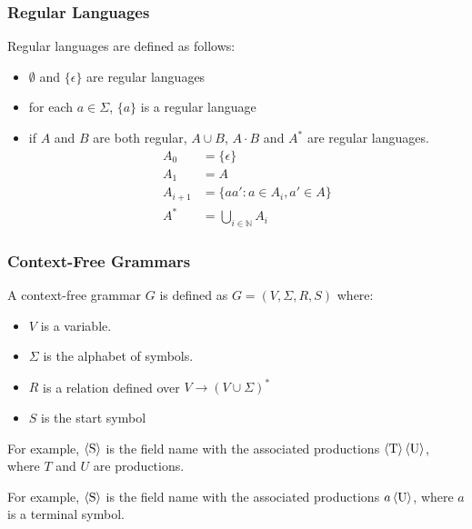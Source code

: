 \subsubsection{Regular Languages}
Regular languages are defined as follows:
\begin{itemize}
\item $\emptyset$ and $\{\epsilon\}$ are regular languages
\item for each $a\in\Sigma$, $\{a\}$ is a regular language
\item if $A$ and $B$ are both regular, $A\cup B$, $A\cdot B$ and $A^*$ are regular languages.
\begin{align*}
    A_0&=\{\epsilon\}\\
    A_1&= A\\
    A_{i+1} &= \{ aa' : a \in A_i, a'\in A\}\\
    A^* &= \bigcup_{i\in\mathbb N} A_i
\end{align*}
\end{itemize}

\subsubsection{Context-Free Grammars}
A context-free grammar $G$ is defined as $G=\left(V,\Sigma, R,S\right)$ where:
\begin{itemize}
\item $V$ is a variable.
\item $\Sigma$ is the alphabet of symbols.
\item $R$ is a relation defined over $V\rightarrow \left(V\cup\Sigma\right)^*$
\item $S$ is the start symbol
\end{itemize}

For example, $\langle \text S \rangle$ is the field name with the associated
productions $\langle \text T \rangle \, \langle \text U \rangle$, where $T$ and
$U$ are productions.

\begin{bnf*}
\end{bnf*}

For example, $\langle \text S \rangle$ is the field name with the associated
productions $a \, \langle \text U \rangle$, where $a$ is a terminal symbol.

